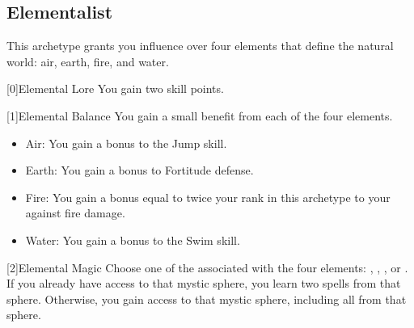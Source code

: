     \newpage
    \subsection{Elementalist}\label{Elementalist}
        This archetype grants you influence over four elements that define the natural world: air, earth, fire, and water.

        [0]{Elemental Lore} You gain two skill points.

        [1]{Elemental Balance} You gain a small benefit from each of the four elements.
        \begin{itemize}
            \item Air: You gain a  bonus to the Jump skill.
            \item Earth: You gain a  bonus to Fortitude defense.
            \item Fire: You gain a bonus equal to twice your rank in this archetype to your  against fire damage.
            \item Water: You gain a  bonus to the Swim skill.
        \end{itemize}

        [2]{Elemental Magic} Choose one of the  associated with the four elements: , , , or .
        If you already have access to that mystic sphere, you learn two spells from that sphere.
        Otherwise, you gain access to that mystic sphere, including all  from that sphere.

